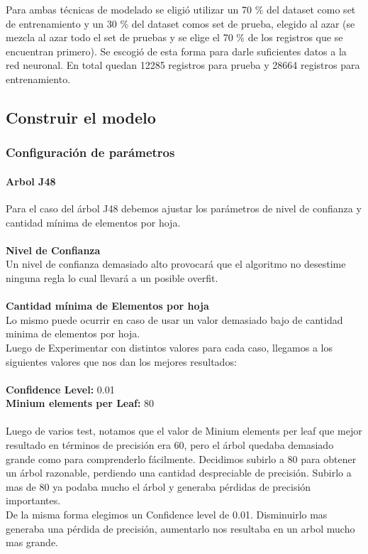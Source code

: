       Para ambas técnicas de modelado se eligió utilizar un 70 \% del dataset
      como set de entrenamiento y un 30 \% del dataset comos set de prueba,
      elegido al azar (se mezcla al azar todo el set de pruebas y se elige el
      70 \% de los registros que se encuentran primero). Se escogió de esta forma
      para darle suficientes datos a la red neuronal. En total quedan 12285
      registros para prueba y 28664 registros para entrenamiento.


\subsection{Construir el modelo}
    \subsubsection{Configuración de parámetros}

      \paragraph{Arbol J48}
          Para el caso del árbol J48 debemos ajustar los parámetros de nivel de
          confianza y cantidad mínima de elementos por hoja.\\\\
          \textbf{Nivel de Confianza\\}
          Un nivel de confianza demasiado alto provocará que el algoritmo no
          desestime ninguna regla lo cual llevará a un posible overfit.\\\\
          \textbf{Cantidad mínima de Elementos por hoja\\}
          Lo mismo puede ocurrir en caso de usar un valor demasiado bajo de
          cantidad minima de elementos por hoja.\\
          Luego de Experimentar con distintos valores para cada caso, llegamos a
          los siguientes valores que nos dan los mejores resultados:\\\\
          \textbf{Confidence Level:} 0.01\\
          \textbf{Minium elements per Leaf:} 80\\\\

          Luego de varios test, notamos que el valor de Minium elements per leaf
          que mejor resultado en términos de precisión era 60, pero el árbol
          quedaba demasiado grande como para comprenderlo fácilmente. Decidimos
          subirlo a 80 para obtener un árbol razonable, perdiendo una cantidad
          despreciable de precisión. Subirlo a mas de 80 ya podaba mucho el
          árbol y generaba pérdidas de precisión importantes.\\
          De la misma forma elegimos un Confidence level de 0.01. Disminuirlo
          mas generaba una pérdida de precisión, aumentarlo nos resultaba en un
          arbol mucho mas grande.

